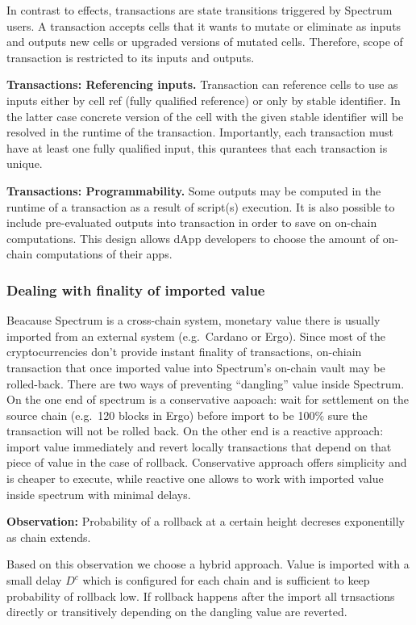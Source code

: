 In contrast to effects, transactions are state transitions triggered by Spectrum users.
A transaction accepts cells that it wants to mutate or eliminate as inputs and outputs new cells or upgraded versions of mutated cells.
Therefore, scope of transaction is restricted to its inputs and outputs.

\textbf{Transactions: Referencing inputs.} Transaction can reference cells to use as inputs either by cell ref (fully qualified reference) or only by stable identifier.
In the latter case concrete version of the cell with the given stable identifier will be resolved in the runtime of the transaction.
Importantly, each transaction must have at least one fully qualified input, this qurantees that each transaction is unique.

\textbf{Transactions: Programmability.} Some outputs may be computed in the runtime of a transaction as a result of script(s) execution.
It is also possible to include pre-evaluated outputs into transaction in order to save on on-chain computations.
This design allows dApp developers to choose the amount of on-chain computations of their apps.

\subsubsection{Dealing with finality of imported value}\label{subsubsec:dealing-with-finality-of-imported-value}

Beacause Spectrum is a cross-chain system, monetary value there is usually imported from an external system (e.g.\ Cardano or Ergo).
Since most of the cryptocurrencies don't provide instant finality of transactions, on-chiain transaction that once imported value into Spectrum's on-chain vault may be rolled-back.
There are two ways of preventing \enquote{dangling} value inside Spectrum.
On the one end of spectrum is a conservative aapoach: wait for settlement on the source chain (e.g.\ 120 blocks in Ergo) before import to be 100\% sure the transaction will not be rolled back.
On the other end is a reactive approach: import value immediately and revert locally transactions that depend on that piece of value in the case of rollback.
Conservative approach offers simplicity and is cheaper to execute, while reactive one allows to work with imported value inside spectrum with minimal delays.

\textbf{Observation:} Probability of a rollback at a certain height decreses exponentilly as chain extends.

Based on this observation we choose a hybrid approach.
Value is imported with a small delay $D^c$ which is configured for each chain and is sufficient to keep probability of rollback low.
If rollback happens after the import all trnsactions directly or transitively depending on the dangling value are reverted.

